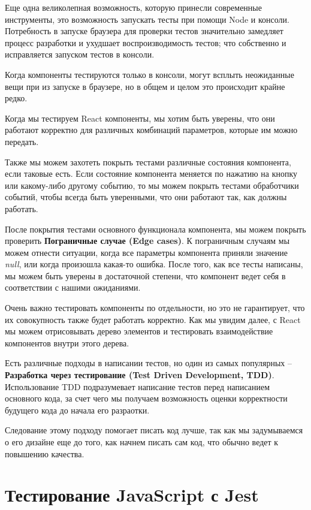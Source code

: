 Еще одна великолепная возможность, которую принесли современные инструменты, это возможность запускать тесты при помощи Node и консоли. Потребность в запуске браузера для проверки тестов значительно замедляет процесс разработки и ухудшает воспроизводимость тестов; что собственно и исправляется запуском тестов в консоли.

Когда компоненты тестируются только в консоли, могут всплыть неожиданные вещи при из запуске в браузере, но в общем и целом это происходит крайне редко.

Когда мы тестируем React компоненты, мы хотим быть уверены, что они работают корректно для различных комбинаций параметров, которые им можно передать. 

Также мы можем захотеть покрыть тестами различные состояния компонента, если таковые есть. Если состояние компонента меняется по нажатию на кнопку или какому-либо другому событию, то мы можем покрыть тестами обработчики событий, чтобы всегда быть уверенными, что они работают так, как должны работать.

После покрытия тестами основного функционала компонента, мы можем покрыть проверить \textbf{Пограничные случае (Edge cases)}. К пограничным случаям мы можем отнести ситуации, когда все параметры компонента приняли значение \textit{null}, или когда произошла какая-то ошибка. После того, как все тесты написаны, мы можем быть уверены в достаточной степени, что компонент ведет себя в соответствии с нашими ожиданиями.

Очень важно тестировать компоненты по отдельности, но это не гарантирует, что их совокупность также будет работать корректно. Как мы увидим далее, с React мы можем отрисовывать дерево элементов и тестировать взаимодействие компонентов внутри этого дерева. 

Есть различные подходы в написании тестов, но один из самых популярных -- \textbf{Разработка через тестирование (Test Driven Development, TDD)}. Использование TDD подразумевает написание тестов перед написанием основного кода, за счет чего мы получаем возможность оценки корректности будущего кода до начала его разраотки. 

Следование этому подходу помогает писать код лучше, так как мы задумываемся о его дизайне еще до того, как начнем писать сам код, что обычно ведет к повышению качества.

\section{Тестирование JavaScript с Jest}

